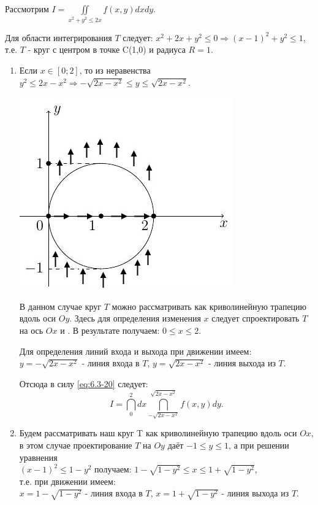 \begin{example}
	Рассмотрим $\displaystyle I = \iint\limits_{x^2 + y^2 \leqslant 2x} f(x,y)dxdy$.

	Для области интегрирования $ T $ следует:
	$x^2 + 2x + y^2 \leqslant 0 \Rightarrow (x-1)^2 + y^2 \leqslant 1$, т.е. $T$ - круг с центром в точке C(1,0) и радиуса $R = 1$.

	\begin{enumerate}
	  \item Если $x \in [0;2]$, то из неравенства $y^2 \leqslant 2x - x^2 \Rightarrow -\sqrt{2x - x^2} \leqslant y \leqslant \sqrt{2x - x^2}$.

		\begin{center}
			\includegraphics[scale=0.7]{img/632.jpg}
		\end{center}
		В данном случае круг $ T $ можно рассматривать как криволинейную трапецию вдоль оси $ Oy $. Здесь для определения изменения $ x $ следует спроектировать $ T $ на ось $ Ox $ и . В результате получаем: $0 \leqslant x \leqslant 2$.

		Для определения линий входа и выхода при движении  имеем:
		\\
		$y = - \sqrt{2x - x^2}$ - линия входа в $ T $, $y =  \sqrt{2x - x^2}$ - линия выхода из $ T $.

		Отсюда в силу \eqref{eq:6.3-20} следует:
		\begin{equation*}
			I = \dint\limits_0^2 dx \dint\limits_{- \sqrt{2x - x^2}}^{\sqrt{2x - x^2}} f(x,y)dy.
		\end{equation*}
	  \item Будем рассматривать наш круг T как криволинейную трапецию вдоль оси $ Ox $, в этом случае проектирование $ T $ на $ Oy $ даёт $ -1 \leqslant y \leqslant 1 $, а при решении уравнения \\
        $(x-1)^2 \leqslant 1-y^2$ получаем:
		$1 - \sqrt{1-y^2} \leqslant x \leqslant 1 + \sqrt{1-y^2}$, \\
        т.е. при движении  имеем:
        \\
		$x = 1 - \sqrt{1 - y^2}$ - линия входа в $ T $, $x = 1 + \sqrt{1 - y^2}$ - линия выхода из $ T $.


\end{enumerate}
\end{example}
